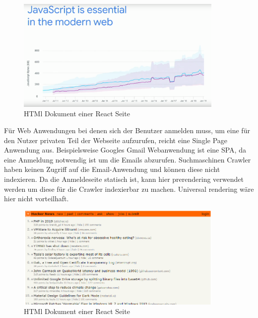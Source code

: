 \documentclass[runningheads]{llncs}
\begin{document}
\begin{figure}
  \centering
  \includegraphics[width=10cm]{images/JavaScriptGoogleShips}
  \caption{HTMl Dokument einer React Seite}
\end{figure}

Für Web Anwendungen bei denen sich der Benutzer anmelden muss, 
um eine für den Nutzer privaten Teil der Webseite aufzurufen, 
reicht eine Single Page Anwendung aus. 
Beispielsweise Googles Gmail Webanwendung ist eine SPA, 
da eine Anmeldung notwendig ist um die Emails abzurufen. 
Suchmaschinen Crawler haben keinen Zugriff auf die Email-Anwendung und 
können diese nicht indexieren. 
Da die Anmeldeseite statisch ist, 
kann hier prerendering verwendet werden um diese für die Crawler indexierbar zu machen. 
Universal rendering wäre hier nicht vorteilhaft.

\begin{figure}
  \centering
  \includegraphics[width=10cm]{images/HackerNews}
  \caption{HTMl Dokument einer React Seite}
\end{figure}
\end{document}
